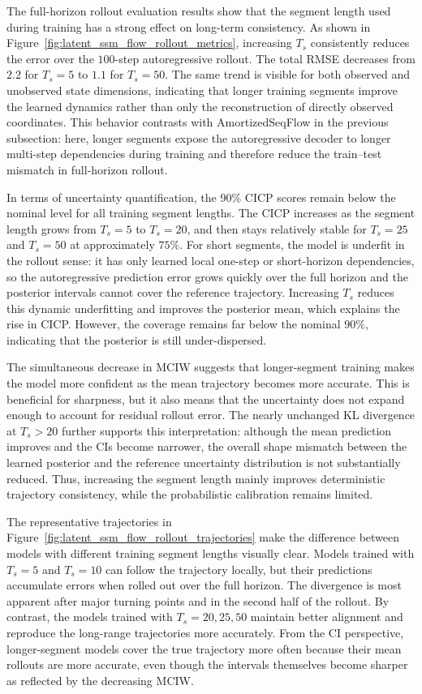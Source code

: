 The full-horizon rollout evaluation results show that the segment length used during training has a strong effect on long-term consistency. As shown in Figure~\ref{fig:latent_ssm_flow_rollout_metrics}, increasing $T_s$ consistently reduces the error over the $100$-step autoregressive rollout. The total RMSE decreases from $2.2$ for $T_s=5$ to $1.1$ for $T_s=50$. The same trend is visible for both observed and unobserved state dimensions, indicating that longer training segments improve the learned dynamics rather than only the reconstruction of directly observed coordinates. This behavior contrasts with AmortizedSeqFlow in the previous subsection: here, longer segments expose the autoregressive decoder to longer multi-step dependencies during training and therefore reduce the train--test mismatch in full-horizon rollout.

In terms of uncertainty quantification, the 90\% \ac{CICP} scores remain below the nominal level for all training segment lengths. The \ac{CICP} increases as the segment length grows from $T_s=5$ to $T_s=20$, and then stays relatively stable for $T_s=25$ and $T_s=50$ at approximately $75\%$. For short segments, the model is underfit in the rollout sense: it has only learned local one-step or short-horizon dependencies, so the autoregressive prediction error grows quickly over the full horizon and the posterior intervals cannot cover the reference trajectory. Increasing $T_s$ reduces this dynamic underfitting and improves the posterior mean, which explains the rise in \ac{CICP}. However, the coverage remains far below the nominal $90\%$, indicating that the posterior is still under-dispersed.

The simultaneous decrease in \ac{MCIW} suggests that longer-segment training makes the model more confident as the mean trajectory becomes more accurate. This is beneficial for sharpness, but it also means that the uncertainty does not expand enough to account for residual rollout error. The nearly unchanged KL divergence at $T_s>20$ further supports this interpretation: although the mean prediction improves and the \acp{CI} become narrower, the overall shape mismatch between the learned posterior and the reference uncertainty distribution is not substantially reduced. Thus, increasing the segment length mainly improves deterministic trajectory consistency, while the probabilistic calibration remains limited.

The representative trajectories in Figure~\ref{fig:latent_ssm_flow_rollout_trajectories} make the difference between models with different training segment lengths visually clear. Models trained with $T_s=5$ and $T_s=10$ can follow the trajectory locally, but their predictions accumulate errors when rolled out over the full horizon. The divergence is most apparent after major turning points and in the second half of the rollout. By contrast, the models trained with $T_s=20,25,50$ maintain better alignment and reproduce the long-range trajectories more accurately. From the \ac{CI} perspective, longer-segment models cover the true trajectory more often because their mean rollouts are more accurate, even though the intervals themselves become sharper as reflected by the decreasing \ac{MCIW}. 

